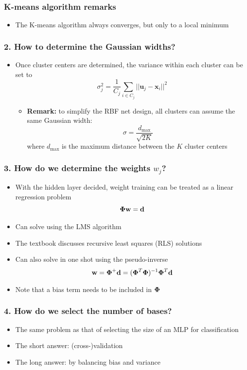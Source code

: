 \documentclass[12pt,notes,mathserif]{beamer}
\begin{document}
\begin{frame}[c]
	\frametitle{K-means algorithm remarks}
	\begin{itemize}
		\item The K-means algorithm always converges, but only to a local minimum
	\end{itemize}
\end{frame}


\begin{frame}[c]
	\frametitle{2. How to determine the Gaussian widths?}
	\begin{itemize}
		\item Once cluster centers are determined, the variance within each cluster can be set to
		      \[
			      \sigma_j^2=\frac{1}{C_j}\sum_{i\in C_j}||\mathbf{u}_j-\mathbf{x}_i||^2
		      \]
		      \begin{itemize}
			      \item {\bf Remark:} to simplify the RBF net design, all clusters can assume the same Gaussian width:
			            \[
				            \sigma=\frac{d_{\max}}{\sqrt{2K}}
			            \]
			            where $d_{\max}$ is the maximum distance between the $K$ cluster centers
		      \end{itemize}
	\end{itemize}
\end{frame}

\begin{frame}[c]
	\frametitle{3. How do we determine the weights $w_j$?}
	\begin{itemize}
		\item With the hidden layer decided, weight training can be treated as a linear regression problem
		      \[
			      \boldsymbol{\Phi} \mathbf{w}=\mathbf{d}
		      \]
		\item Can solve using the LMS algorithm
		\item The textbook discusses recursive least squares (RLS) solutions
		\item Can also solve in one shot using the pseudo-inverse
		      \[
			      \mathbf{w}=\boldsymbol{\Phi}^+\mathbf{d}=(\boldsymbol{\Phi}^T\boldsymbol{\Phi})^{-1}\boldsymbol{\Phi}^T\mathbf{d}
		      \]
		\item Note that a bias term needs to be included in ${\boldsymbol{\Phi}}$
	\end{itemize}
\end{frame}



\begin{frame}[c]
	\frametitle{4. How do we select the number of bases?}
	\begin{itemize}
		\item The same problem as that of selecting the size of an MLP for classification
		\item The short answer: (cross-)validation
		\item The long answer: by balancing bias and variance
	\end{itemize}
\end{frame}
\end{document}
